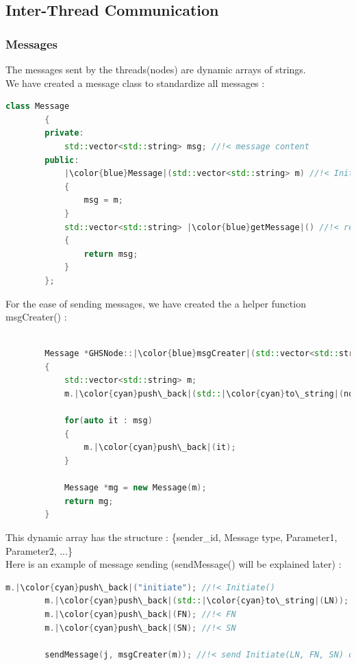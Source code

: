 \documentclass[letterpaper,11pt]{article}
\begin{document}
	\subsection{Inter-Thread Communication}
	
	\subsubsection{Messages}
	
	The messages sent by the threads(nodes) are dynamic arrays of strings. \\
	
	We have created a message class to standardize all messages : 
	\begin{lstlisting}[language=C++, caption = Message Class]
		class Message
		{
		private:
			std::vector<std::string> msg; //!< message content
		public:
			|\color{blue}Message|(std::vector<std::string> m) //!< Initiates a message
			{
				msg = m;
			}
			std::vector<std::string> |\color{blue}getMessage|() //!< returns the message
			{
				return msg;
			}
		};
	\end{lstlisting}
	
	\newpage
	
	For the ease of sending messages, we have created the a helper function {\sc msgCreater}() : 
	
	
	\begin{lstlisting}[language=C++, caption = msgCreater]
		
		Message *GHSNode::|\color{blue}msgCreater|(std::vector<std::string> msg)
		{
			std::vector<std::string> m;
			m.|\color{cyan}push\_back|(std::|\color{cyan}to\_string|(nodeid));
			
			for(auto it : msg)
			{
				m.|\color{cyan}push\_back|(it);
			}
			
			Message *mg = new Message(m);
			return mg;
		}
	\end{lstlisting}
	
	\bigskip
	
	This dynamic array has the structure : \{sender\_id, Message type, Parameter1, Parameter2, ...\} \\
	
	Here is an example of message sending ({\sc sendMessage}() will be explained later) : 
	
	
	\begin{lstlisting}[language=C++, caption = sendMessage Sample]
		m.|\color{cyan}push\_back|("initiate"); //!< Initiate()
		m.|\color{cyan}push\_back|(std::|\color{cyan}to\_string|(LN)); //!< LN
		m.|\color{cyan}push\_back|(FN); //!< FN
		m.|\color{cyan}push\_back|(SN); //!< SN
		
		sendMessage(j, msgCreater(m)); //!< send Initiate(LN, FN, SN) on edge j 
	\end{lstlisting}
	
\end{document}
